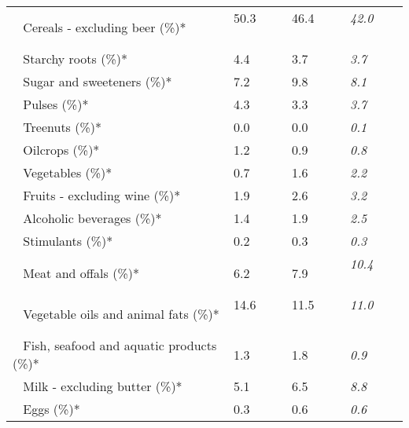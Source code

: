 \begin{tabular}{L{3.9cm} R{1cm} R{1cm} R{1cm}}
	 ~ Cereals - excluding beer (\%)* & 50.3 ~ \ \ & 46.4 ~ \ \ & \textit{42.0} ~ \ \ \\ 
	 ~ Starchy roots (\%)* & 4.4 ~ \ \ & 3.7 ~ \ \ & \textit{3.7} ~ \ \ \\ 
	 ~ Sugar and sweeteners (\%)* & 7.2 ~ \ \ & 9.8 ~ \ \ & \textit{8.1} ~ \ \ \\ 
	 ~ Pulses (\%)* & 4.3 ~ \ \ & 3.3 ~ \ \ & \textit{3.7} ~ \ \ \\ 
	 ~ Treenuts (\%)* & 0.0 ~ \ \ & 0.0 ~ \ \ & \textit{0.1} ~ \ \ \\ 
	 ~ Oilcrops (\%)* & 1.2 ~ \ \ & 0.9 ~ \ \ & \textit{0.8} ~ \ \ \\ 
	 ~ Vegetables (\%)* & 0.7 ~ \ \ & 1.6 ~ \ \ & \textit{2.2} ~ \ \ \\ 
	 ~ Fruits - excluding wine (\%)* & 1.9 ~ \ \ & 2.6 ~ \ \ & \textit{3.2} ~ \ \ \\ 
	 ~ Alcoholic beverages (\%)* & 1.4 ~ \ \ & 1.9 ~ \ \ & \textit{2.5} ~ \ \ \\ 
	 ~ Stimulants (\%)* & 0.2 ~ \ \ & 0.3 ~ \ \ & \textit{0.3} ~ \ \ \\ 
	 ~ Meat and offals (\%)* & 6.2 ~ \ \ & 7.9 ~ \ \ & \textit{10.4} ~ \ \ \\ 
	 ~ Vegetable oils and animal fats (\%)* & 14.6 ~ \ \ & 11.5 ~ \ \ & \textit{11.0} ~ \ \ \\ 
	 ~ Fish, seafood and aquatic products (\%)* & 1.3 ~ \ \ & 1.8 ~ \ \ & \textit{0.9} ~ \ \ \\ 
	 ~ Milk - excluding butter (\%)* & 5.1 ~ \ \ & 6.5 ~ \ \ & \textit{8.8} ~ \ \ \\ 
	 ~ Eggs (\%)* & 0.3 ~ \ \ & 0.6 ~ \ \ & \textit{0.6} ~ \ \ \\ 
       \toprule
      \end{tabular}
      \clearpage
{}

